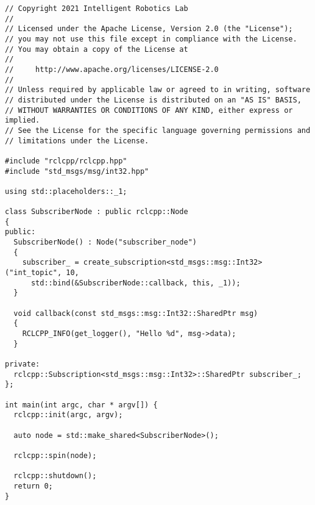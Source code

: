  \footnotesize
\begin{tcolorbox}[sharp corners, colframe=gray!80, colback=LightGray, left=0pt, top=0pt, bottom=0pt, title=\texttt{br2\_basics/src/subscriber\_class.cpp}]
  \begin{verbatim}
// Copyright 2021 Intelligent Robotics Lab
//
// Licensed under the Apache License, Version 2.0 (the "License");
// you may not use this file except in compliance with the License.
// You may obtain a copy of the License at
//
//     http://www.apache.org/licenses/LICENSE-2.0
//
// Unless required by applicable law or agreed to in writing, software
// distributed under the License is distributed on an "AS IS" BASIS,
// WITHOUT WARRANTIES OR CONDITIONS OF ANY KIND, either express or implied.
// See the License for the specific language governing permissions and
// limitations under the License.

#include "rclcpp/rclcpp.hpp"  
#include "std_msgs/msg/int32.hpp"

using std::placeholders::_1;

class SubscriberNode : public rclcpp::Node
{
public:
  SubscriberNode() : Node("subscriber_node")
  {
    subscriber_ = create_subscription<std_msgs::msg::Int32>("int_topic", 10,
      std::bind(&SubscriberNode::callback, this, _1));
  }

  void callback(const std_msgs::msg::Int32::SharedPtr msg)
  {
    RCLCPP_INFO(get_logger(), "Hello %d", msg->data);
  }

private:
  rclcpp::Subscription<std_msgs::msg::Int32>::SharedPtr subscriber_;
};

int main(int argc, char * argv[]) { 
  rclcpp::init(argc, argv);  

  auto node = std::make_shared<SubscriberNode>();

  rclcpp::spin(node); 

  rclcpp::shutdown();  
  return 0;  
}    \end{verbatim}
    \end{tcolorbox}
  \normalsize

